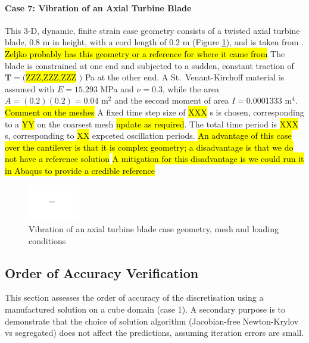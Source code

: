 \documentclass[sn-mathphys,Numbered]{sn-jnl}%
\newcommand{\bb}{\boldsymbol}
\begin{document}
\paragraph{Case 7: Vibration of an Axial Turbine Blade}
This 3-D, dynamic, finite strain case geometry consists of a twisted axial turbine blade, 0.8 m in height, with a cord length of 0.2 m (Figure \ref{fig:turbine_blade}), and is taken from \citet{Tukovic2007}.
\hl{Zeljko probably has this geometry or a reference for where it came from}
The blade is constrained at one end and subjected to a sudden, constant traction of $\bb{T} = ($\hl{ZZZ,ZZZ,ZZZ} $)$ Pa at the other end.
A St.\ Venant-Kirchoff material is assumed with $E = 15.293$ MPa and $\nu = 0.3$, while the area $A = (0.2)(0.2) = 0.04$ m$^2$ and the second moment of area $I = 0.0001333$ m$^4$.
\hl{Comment on the meshes}
A fixed time step size of \hl{XXX} s is chosen, corresponding to a \hl{YY} on the coarsest mesh \hl{update as required}.
The total time period is \hl{XXX} s, corresponding to \hl{XX} expceted oscillation periods.
\hl{An advantage of this case over the cantilever is that it is complex geometry; a disadvantage is that we do not have a reference solution}
\hl{A mitigation for this disadvantage is we could run it in Abaqus to provide a credible reference}
\begin{figure}[htbp]
   \centering
   \includegraphics[width=0.2\textwidth]{figures/placeholder.pdf} 
   \caption{Vibration of an axial turbine blade case geometry, mesh and loading conditions}
   \label{fig:turbine_blade}
\end{figure}


\subsection{Order of Accuracy Verification}
This section assesses the order of accuracy of the discretisation using a manufactured solution on a cube domain (case 1).
A secondary purpose is to demonstrate that the choice of solution algorithm (Jacobian-free Newton-Krylov vs segregated) does not affect the predictions, assuming iteration errors are small.
\end{document}
